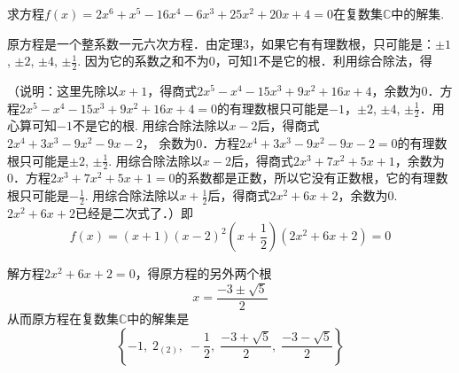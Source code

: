 \begin{example}
    求方程$f(x)=2x^6+x^5-16x^4-6x^3+25x^2+20x+4=0$在复数集$\mathbb{C}$中的解集.
\end{example}

\begin{solution}
    原方程是一个整系数一元六次方程．由定理3，如果它有有理数根，只可能是：$\pm 1$, $\pm2$, $\pm4$, $\pm\frac{1}{2}$. 因为它的系数之和不为0，可知1不是它的根．利用综合除法，得
 \begin{center}
\end{center}

（说明：这里先除以$x+1$，得商式$2x^5-x^4-15x^3+9x^2+16x+4$，余数为0．方程$2x^5-x^4-15x^3+9x^2+16x+4=0$的有理数根只可能是$-1$，$\pm 2$, $\pm4$, $\pm\frac{1}{2}$．用心算可知$-1$不是它的根. 用综合除法除以$x-2$后，得商式$2x^4+3x^3-9x^2-9x-2$，
余数为0．方程$2x^4+3x^3-9x^2-9x-2=0$的有理数根只可能是$\pm 2$, $\pm\frac{1}{2}$. 用综合除法除以$x-2$后，得商式$2x^3+7x^2+5x+1$，余数为0．方程$2x^3+7x^2+5x+1=0$的系数都是正数，所以它没有正数根，它的有理数根只可能是$-\frac{1}{2}$. 用综合除法除以$x+\frac{1}{2}$后，得商式$2x^2+6x+2$，余数为0. $2x^2+6x+2$已经是二次式了．）即
\[f(x)=(x+1)(x-2)^2\left(x+\frac{1}{2}\right)(2x^2+6x+2)=0\]

解方程$2x^2+6x+2=0$，得原方程的另外两个根
\[x=\frac{-3\pm\sqrt{5}}{2}\]
从而原方程在复数集$\mathbb{C}$中的解集是
\[\left\{-1,\; 2_{(2)},\; -\frac{1}{2},\; \frac{-3+\sqrt{5}}{2},\; \frac{-3-\sqrt{5}}{2}\right\}\]
\end{solution}

